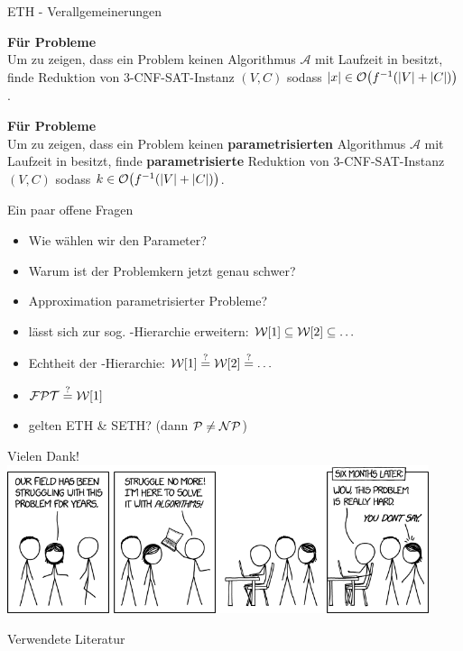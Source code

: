 \documentclass[navbaroff]{sdqbeamer}
\begin{document}
\begin{frame}{ETH - Verallgemeinerungen}
    \begin{blueblock}{}
        \textbf{Für  Probleme}
        \\
        Um zu zeigen, dass ein Problem keinen Algorithmus $\mathcal{A}$
        mit Laufzeit in  besitzt, finde Reduktion von 3-\textsc{CNF-SAT}-Instanz $(V, C)$ sodass
        $|x| \in \operatorname{\mathcal{O}}\bigl(f^{-1}(|V| + |C|)\bigr)$.
    \end{blueblock}

    \begin{blueblock}{}
        \textbf{Für  Probleme}
        \\
        Um zu zeigen, dass ein Problem keinen \textbf{parametrisierten} Algorithmus $\mathcal{A}$
        mit Laufzeit in  besitzt, finde \textbf{parametrisierte} Reduktion von 3-\textsc{CNF-SAT}-Instanz $(V, C)$ sodass
        $k \in \operatorname{\mathcal{O}}\bigl(f^{-1}(|V| + |C|)\bigr)$.
    \end{blueblock}
\end{frame}

\begin{frame}{Ein paar offene Fragen}
    \begin{itemize}
        \item Wie wählen wir den Parameter?
        \item Warum ist der Problemkern jetzt genau schwer?
        \item Approximation parametrisierter Probleme?
        \item \W[1] lässt sich zur sog. \W-Hierarchie erweitern: $\mathcal{W}[1] \subseteq \mathcal{W}[2] \subseteq \dots $
        \item Echtheit der \W-Hierarchie: $\mathcal{W}[1] \stackrel{?}{=} \mathcal{W}[2] \stackrel{?}{=} \dots $
        \item $\mathcal{FPT} \stackrel{?}{=} \mathcal{W}[1]$
        \item gelten ETH \& SETH? (dann $\mathcal{P} \neq \mathcal{NP}$)
    \end{itemize}
\end{frame}

\begin{frame}{Vielen Dank!}
    \centering
    \includegraphics[width=350pt]{images/xkcd.png}
\end{frame}

\begin{frame}{Verwendete Literatur}
    \nocite{*}
    \printbibliography
\end{frame}
\end{document}
